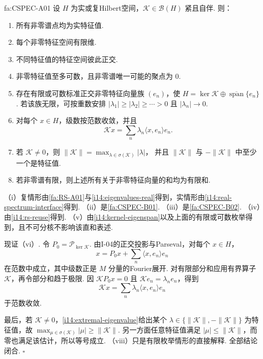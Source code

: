 \begin{FATheorem}[A][紧自伴算子谱定理]{fa:CSPEC-A01}
设 \(\displaystyle H\) 为实或复Hilbert空间，\(\displaystyle \mathcal K\in\mathcal B(H)\) 紧且自伴. 则：
\begin{enumerate}[label=\textup{(\roman*)}]
\item 所有非零谱点均为实特征值.
\item 每个非零特征空间有限维.
\item 不同特征值的特征空间彼此正交.
\item 非零特征值至多可数，且非零谱唯一可能的聚点为 \(\displaystyle0\).
\item 存在有限或可数标准正交非零特征向量族 \(\displaystyle (e_n)\)，使
\(\displaystyle H = \ker\mathcal K \oplus \overline{\operatorname{span}}\{e_n\}\).
若该族无限，可按重数安排 \(\displaystyle |\lambda_1|\geqslant|\lambda_2|\geqslant\cdots>0\) 且 \(\displaystyle |\lambda_n|\to0\).
\item 对每个 \(\displaystyle x\in H\)，级数按范数收敛，并且
\[
\mathcal Kx
=
\sum_n
\lambda_n\langle x,e_n\rangle e_n.
\]
\item 若 \(\displaystyle \mathcal K\neq0\)，则
\(\displaystyle \|\mathcal K\| = \max_{\lambda\in\sigma(\mathcal K)}|\lambda|\)，
并且 \(\displaystyle \|\mathcal K\|\) 与 \(\displaystyle -\|\mathcal K\|\) 中至少一个是特征值.
\item 若非零谱有限，则上述所有关于非零特征向量的和均为有限和.
\end{enumerate}
\end{FATheorem}

\begin{FAProof}
（i）复情形由\autoref{fa:RS-A01}与\autoref{i14:eigenvalues-real}得到，实情形由\autoref{i14:real-spectrum-interface}得到. （ii）是\autoref{fa:CSPEC-B01}. （iii）是\autoref{fa:CSPEC-B02}. （iv）由\autoref{i14:rs-reuse}得到. （v）由\autoref{i14:kernel-eigenspan}以及上面的有限或可数枚举得到，且不可分核不影响该直和表述.

现证（vi）. 令 \(\displaystyle P_0=\mathcal P_{\ker\mathcal K}\). 由I-04的正交投影与Parseval，对每个 \(\displaystyle x\in H\)，
\[
x
=
P_0x
+
\sum_n\langle x,e_n\rangle e_n
\]
在范数中成立，其中级数正是 \(\displaystyle M\) 分量的Fourier展开. 对有限部分和应用有界算子 \(\displaystyle \mathcal K\)，再令部分和趋于极限. 因 \(\displaystyle \mathcal KP_0x=0\) 且 \(\displaystyle \mathcal Ke_n=\lambda_ne_n\)，得到
\[
\mathcal Kx
=
\sum_n
\lambda_n\langle x,e_n\rangle e_n
\]
于范数收敛.

最后，若 \(\displaystyle \mathcal K\neq0\)，\autoref{i14:extremal-eigenvalue}给出某个 \(\displaystyle \lambda\in\{\|\mathcal K\|,-\|\mathcal K\|\}\) 为特征值，故 \(\displaystyle \max_{\mu\in\sigma(\mathcal K)}|\mu|\geqslant\|\mathcal K\|\). 另一方面任意特征值满足 \(\displaystyle |\mu|\leqslant\|\mathcal K\|\)，而零也满足该估计，所以等号成立. （viii）只是有限枚举情形的直接解释. 全部结论闭合.
\hfill\(\square\)
\end{FAProof}

